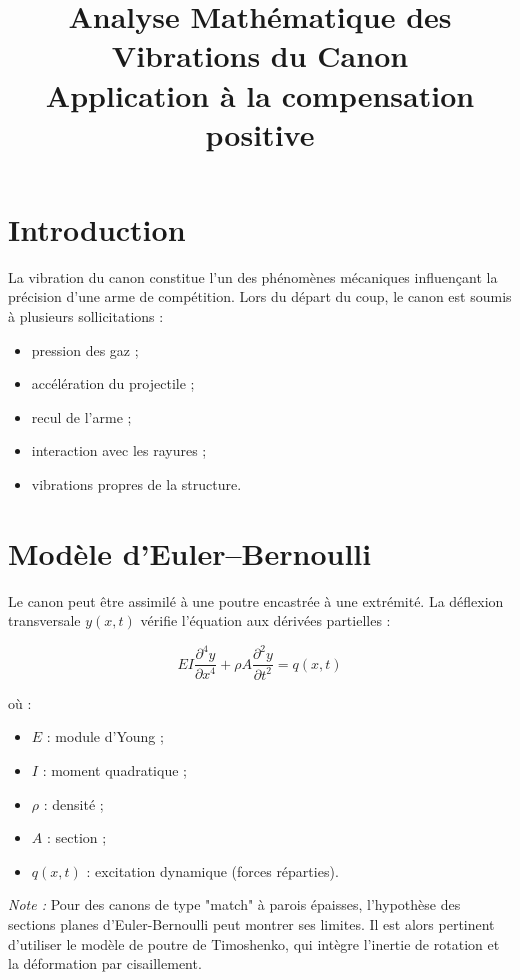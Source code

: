 \documentclass[11pt,a4paper]{article}
\title{Analyse Mathématique des Vibrations du Canon \\ \large Application à la compensation positive}
\author{}
\date{}
\begin{document}
	
	\maketitle
	
	\section{Introduction}
	
	La vibration du canon constitue l'un des phénomènes mécaniques influençant la précision d'une arme de compétition. Lors du départ du coup, le canon est soumis à plusieurs sollicitations :
	
	\begin{itemize}
		\item pression des gaz ;
		\item accélération du projectile ;
		\item recul de l'arme ;
		\item interaction avec les rayures ;
		\item vibrations propres de la structure.
	\end{itemize}
	
	\section{Modèle d'Euler--Bernoulli}
	
	Le canon peut être assimilé à une poutre encastrée à une extrémité. La déflexion transversale $y(x,t)$ vérifie l'équation aux dérivées partielles :
	
	\begin{equation}
		EI\frac{\partial^4 y}{\partial x^4} + \rho A\frac{\partial^2 y}{\partial t^2} = q(x,t)
	\end{equation}
	
	où :
	
	\begin{itemize}
		\item $E$ : module d'Young ;
		\item $I$ : moment quadratique ;
		\item $\rho$ : densité ;
		\item $A$ : section ;
		\item $q(x,t)$ : excitation dynamique (forces réparties).
	\end{itemize}
	
	\textit{Note :} Pour des canons de type "match" à parois épaisses, l'hypothèse des sections planes d'Euler-Bernoulli peut montrer ses limites. Il est alors pertinent d'utiliser le modèle de poutre de Timoshenko, qui intègre l'inertie de rotation et la déformation par cisaillement.
\end{document}
